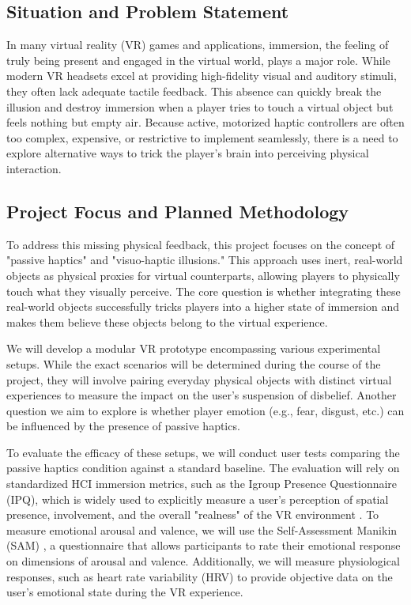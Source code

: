 
\subsection*{Situation and Problem Statement}
In many virtual reality (VR) games and applications, immersion, the feeling of truly being present and engaged in the virtual world, plays a major role. While modern VR headsets excel at providing high-fidelity visual and auditory stimuli, they often lack adequate tactile feedback. This absence can quickly break the illusion and destroy immersion when a player tries to touch a virtual object but feels nothing but empty air. Because active, motorized haptic controllers are often too complex, expensive, or restrictive to implement seamlessly, there is a need to explore alternative ways to trick the player's brain into perceiving physical interaction.

\subsection*{Project Focus and Planned Methodology}
To address this missing physical feedback, this project focuses on the concept of "passive haptics" and "visuo-haptic illusions." This approach uses inert, real-world objects as physical proxies for virtual counterparts, allowing players to physically touch what they visually perceive. The core question is whether integrating these real-world objects successfully tricks players into a higher state of immersion and makes them believe these objects belong to the virtual experience.

We will develop a modular VR prototype encompassing various experimental setups. While the exact scenarios will be determined during the course of the project, they will involve pairing everyday physical objects with distinct virtual experiences to measure the impact on the user's suspension of disbelief. Another question we aim to explore is whether player emotion (e.g., fear, disgust, etc.) can be influenced by the presence of passive haptics.

To evaluate the efficacy of these setups, we will conduct user tests comparing the passive haptics condition against a standard baseline. The evaluation will rely on standardized HCI immersion metrics, such as the Igroup Presence Questionnaire (IPQ), which is widely used to explicitly measure a user's perception of spatial presence, involvement, and the overall "realness" of the VR environment \cite{presence-questionnaires}. To measure emotional arousal and valence, we will use the Self-Assessment Manikin (SAM) \cite{sam}, a questionnaire that allows participants to rate their emotional response on dimensions of arousal and valence. Additionally, we will measure physiological responses, such as heart rate variability (HRV) to provide objective data on the user's emotional state during the VR experience.

